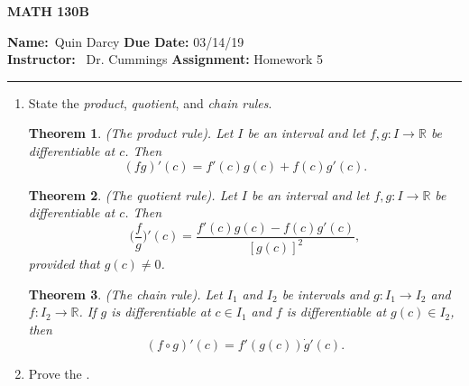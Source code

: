 \documentclass[12pt]{article}
\newtheorem{theorem}{Theorem}[section]
\theoremstyle{definition}
\theoremstyle{remark}
\begin{document}
\begin{center}
	\vspace{.4cm} {\textbf { \large MATH 130B}}
\end{center}
{\textbf{Name:}\ Quin Darcy \hspace{\fill} \textbf{Due Date:} 03/14/19   \\
{ \textbf{Instructor:}} \ Dr. Cummings \hspace{\fill} \textbf{Assignment:} Homework 5 \\ \hrule}

\justifying


\begin{enumerate}[leftmargin=*]

    \item State the \textit{product}, \textit{quotient}, and \textit{chain rules}. 
        \begin{theorem}
            (The product rule). Let $I$ be an interval and let $f,g\colon I\rightarrow\mathbb{R}$ be differentiable at $c$. Then
            \begin{equation*}
                (fg)'(c)=f'(c)g(c)+f(c)g'(c).
            \end{equation*}
        \end{theorem}
        \begin{theorem}
            (The quotient rule). Let $I$ be an interval and let $f,g\colon I\rightarrow\mathbb{R}$ be differentiable at $c$. Then 
            \begin{equation*}
                \bigg(\frac{f}{g}\bigg)'(c)=\frac{f'(c)g(c)-f(c)g'(c)}{[g(c)]^2},
            \end{equation*}
            provided that $g(c)\neq 0$.
        \end{theorem}
        \begin{theorem}
            (The chain rule). Let $I_1$ and $I_2$ be intervals and $g\colon I_1\rightarrow I_2$ and $f\colon I_2\rightarrow\mathbb{R}$. If $g$ is differentiable at $c\in I_1$ and $f$ is differentiable at $g(c)\in I_2$, then
            \begin{equation*}
                (f\circ g)'(c)=f'(g(c))\dot g'(c).
            \end{equation*}
            
        \end{theorem}
    
    \item Prove the .
    

\end{enumerate}
\end{document}
